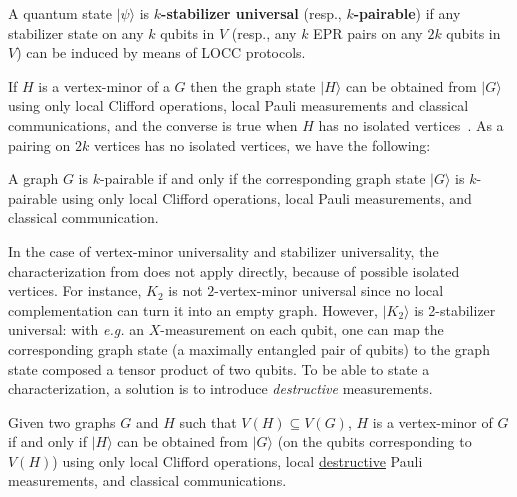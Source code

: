 \documentclass[a4paper,UKenglish,cleveref, autoref, thm-restate]{arxiv}
\newcommand{\ket}[1]{{\ensuremath{\lvert#1\rangle}}}
\newcommand{\se}{\subseteq}
\begin{document}
\begin{definition}
A quantum state $\ket{\psi}$ is \textbf{$k$-stabilizer universal} (resp., \textbf{$k$-pairable}) if any stabilizer state on any $k$ qubits in $V$ (resp., any $k$ EPR pairs on any $2k$ qubits in $V$) can be induced by means of LOCC protocols. 
\end{definition}

If $H$ is a vertex-minor of a $G$ then the graph state $\ket{H}$ can be obtained from $\ket G$ using only local Clifford operations, local Pauli measurements and classical communications, and the converse is true when $H$ has no isolated vertices~\cite{DWH:transfo}. As a pairing on $2k$ vertices has no isolated vertices, we have the following:

\begin{proposition}
    A graph $G$ is $k$-pairable if and only if the corresponding graph state $\ket G$ is $k$-pairable using only local Clifford operations, local Pauli measurements, and classical communication.
\end{proposition}

In the case of vertex-minor universality and stabilizer universality, the characterization from \cite{DWH:transfo} does not apply directly, because of possible isolated vertices. For instance, $K_2$ is not $2$-vertex-minor universal since no local complementation can turn it into an empty graph. However, $\ket{K_2}$ is 2-stabilizer universal: with \emph{e.g.} an $X$-measurement on each qubit, one can map the corresponding graph state (a maximally entangled pair of qubits) to the graph state composed a tensor product of two qubits. To be able to state a characterization, a solution is to introduce \emph{destructive} measurements.

\begin{proposition}\label{prop:vm}
   Given two graphs $G$ and $H$ such that $V(H) \se V(G)$, $H$ is a vertex-minor of $G$ if and only if $\ket H$ can be obtained from $\ket G$ (on the qubits corresponding to $V(H)$) using only local Clifford operations, local \underline{destructive} Pauli measurements, and classical communications.    
\end{proposition}
\end{document}

